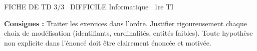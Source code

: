 \documentclass[11pt]{article}
\begin{document}
\begin{tcolorbox}[enhanced,colback=popink,colframe=popink,arc=10pt,boxrule=0pt,left=12pt,right=12pt,top=9pt,bottom=9pt]
{\color{white}\popxbold\small FICHE DE TD 3/3 \textbullet\ DIFFICILE \hfill Informatique \textbullet\ 1re TI\par}
\end{tcolorbox}
\vspace{4pt}
\noindent \textbf{Consignes :} Traiter les exercices dans l'ordre. Justifier rigoureusement chaque choix de modélisation (identifiants, cardinalités, entités faibles). Toute hypothèse non explicite dans l'énoncé doit être clairement énoncée et motivée.
\end{document}
